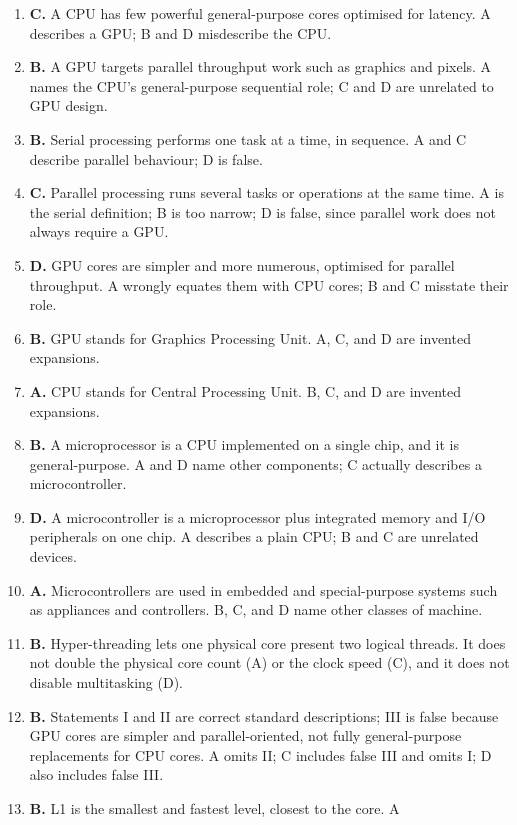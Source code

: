 \begin{enumerate}[label=\textbf{Q\arabic*.}, leftmargin=*]
\item \textbf{C.} A CPU has few powerful general-purpose cores optimised for
  latency. A describes a GPU; B and D misdescribe the CPU.
\item \textbf{B.} A GPU targets parallel throughput work such as graphics and
  pixels. A names the CPU's general-purpose sequential role; C and D are
  unrelated to GPU design.
\item \textbf{B.} Serial processing performs one task at a time, in sequence.
  A and C describe parallel behaviour; D is false.
\item \textbf{C.} Parallel processing runs several tasks or operations at the
  same time. A is the serial definition; B is too narrow; D is false, since
  parallel work does not always require a GPU.
\item \textbf{D.} GPU cores are simpler and more numerous, optimised for
  parallel throughput. A wrongly equates them with CPU cores; B and C
  misstate their role.
\item \textbf{B.} GPU stands for Graphics Processing Unit. A, C, and D are
  invented expansions.
\item \textbf{A.} CPU stands for Central Processing Unit. B, C, and D are
  invented expansions.
\item \textbf{B.} A microprocessor is a CPU implemented on a single chip, and
  it is general-purpose. A and D name other components; C actually describes
  a microcontroller.
\item \textbf{D.} A microcontroller is a microprocessor plus integrated memory
  and I/O peripherals on one chip. A describes a plain CPU; B and C are
  unrelated devices.
\item \textbf{A.} Microcontrollers are used in embedded and special-purpose
  systems such as appliances and controllers. B, C, and D name other classes
  of machine.
\item \textbf{B.} Hyper-threading lets one physical core present two logical
  threads. It does not double the physical core count (A) or the clock speed
  (C), and it does not disable multitasking (D).
\item \textbf{B.} Statements I and II are correct standard descriptions; III
  is false because GPU cores are simpler and parallel-oriented, not fully
  general-purpose replacements for CPU cores. A omits II; C includes false
  III and omits I; D also includes false III.
\item \textbf{B.} L1 is the smallest and fastest level, closest to the core. A

\end{enumerate}
